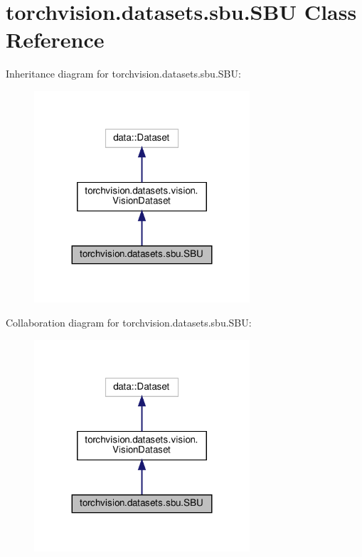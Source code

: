 \hypertarget{classtorchvision_1_1datasets_1_1sbu_1_1SBU}{}\section{torchvision.\+datasets.\+sbu.\+S\+BU Class Reference}
\label{classtorchvision_1_1datasets_1_1sbu_1_1SBU}


Inheritance diagram for torchvision.\+datasets.\+sbu.\+S\+BU\+:
\nopagebreak
\begin{figure}[H]
\begin{center}
\leavevmode
\includegraphics[width=227pt]{classtorchvision_1_1datasets_1_1sbu_1_1SBU__inherit__graph}
\end{center}
\end{figure}


Collaboration diagram for torchvision.\+datasets.\+sbu.\+S\+BU\+:
\nopagebreak
\begin{figure}[H]
\begin{center}
\leavevmode
\includegraphics[width=227pt]{classtorchvision_1_1datasets_1_1sbu_1_1SBU__coll__graph}
\end{center}
\end{figure}

